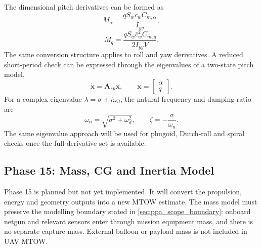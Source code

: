 The dimensional pitch derivatives can be formed as
\begin{equation}
    M_{\alpha} =
    \frac{qS_w\bar{c}_w C_{m,\alpha}}{I_{yy}},
    \label{eq:ppa_m_alpha}
\end{equation}
\begin{equation}
    M_q =
    \frac{qS_w\bar{c}_w^2 C_{m,q}}{2I_{yy}V}.
    \label{eq:ppa_m_q}
\end{equation}
The same conversion structure applies to roll and yaw derivatives. A reduced short-period check can be expressed through the eigenvalues of a two-state pitch model,
\begin{equation}
    \dot{\mathbf{x}} =
    \mathbf{A}_{sp}\mathbf{x},
    \qquad
    \mathbf{x} =
    \begin{bmatrix}
    \alpha \\ q
    \end{bmatrix}.
    \label{eq:ppa_short_period_model}
\end{equation}
For a complex eigenvalue \(\lambda=\sigma\pm i\omega_d\), the natural frequency and damping ratio are
\begin{equation}
    \omega_n=\sqrt{\sigma^2+\omega_d^2},
    \qquad
    \zeta=-\frac{\sigma}{\omega_n}.
    \label{eq:ppa_eigen_damping}
\end{equation}
The same eigenvalue approach will be used for phugoid, Dutch-roll and spiral checks once the full derivative set is available.

\subsection{Phase 15: Mass, CG and Inertia Model}
\label{subsec:ppa_phase15}

Phase 15 is planned but not yet implemented. It will convert the propulsion, energy and geometry outputs into a new MTOW estimate. The mass model must preserve the modelling boundary stated in \autoref{sec:ppa_scope_boundary}: onboard netgun and relevant sensors enter through mission equipment mass, and there is no separate capture mass. External balloon or payload mass is not included in UAV MTOW.

